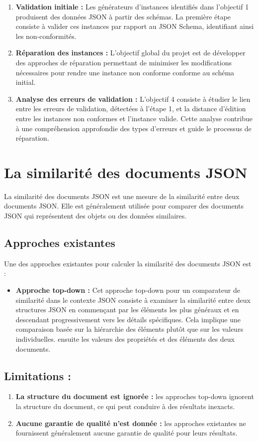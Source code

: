 \begin{enumerate}
    \item \textbf{Validation initiale :} Les générateurs d'instances identifiés dans l'objectif 1 produisent des données JSON à partir des schémas. La première étape consiste à valider ces instances par rapport au JSON Schema, identifiant ainsi les non-conformités.
    
    \item \textbf{Réparation des instances :} L'objectif global du projet est de développer des approches de réparation permettant de minimiser les modifications nécessaires pour rendre une instance non conforme conforme au schéma initial.
    
    \item \textbf{Analyse des erreurs de validation :} L'objectif 4 consiste à étudier le lien entre les erreurs de validation, détectées à l'étape 1, et la distance d'édition entre les instances non conformes et l'instance valide. Cette analyse contribue à une compréhension approfondie des types d'erreurs et guide le processus de réparation.
\end{enumerate}
\section{La similarité des documents JSON}
La similarité des documents JSON est une mesure de la similarité entre deux documents JSON. Elle est généralement utilisée pour comparer des documents JSON qui représentent des objets ou des données similaires.
\subsection{Approches existantes}
Une des approches existantes pour calculer la similarité des documents JSON est :
\begin{itemize}
    \item [\textbullet] \textbf{Approche top-down \cite{JSON_Similarity}:} 
Cet approche top-down pour un comparateur de similarité dans le contexte JSON consiste à examiner la similarité entre deux structures JSON en commençant par les éléments les plus généraux et en descendant progressivement vers les détails spécifiques. Cela implique une comparaison basée sur la hiérarchie des éléments plutôt que sur les valeurs individuelles. ensuite les valeurs des propriétés et des éléments des deux documents.
\end{itemize}
\subsection{Limitations :}
\begin{enumerate}
    \item \textbf{La structure du document est ignorée :} les approches top-down ignorent la structure du document, ce qui peut conduire à des résultats inexacts.
    \item \textbf{Aucune garantie de qualité n'est donnée :} les approches existantes ne fournissent généralement aucune garantie de qualité pour leurs résultats.
\end{enumerate}
